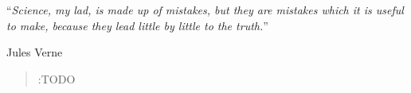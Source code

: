 \documentclass[
11pt, %
english, %
singlespacing, %
headsepline, %
]{BachelorMasterThesis} %
\begin{document}
\cleardoublepage


\vspace*{0.2\textheight}

\noindent\enquote{\itshape Science, my lad, is made up of mistakes, but they are mistakes which it is useful to make, because they lead little by little to the truth.}\bigbreak

\hfill Jules Verne


\begin{abstract}
\addchaptertocentry{\abstractname} %




:TODO
\end{abstract}

\end{document}
